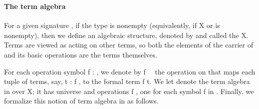 \begin{code}
\AgdaSymbol{)}\AgdaSpace{}%
\AgdaSymbol{=}\AgdaSpace{}%
\AgdaSpace{}%
\AgdaSymbol{(}\AgdaSpace{}%
\AgdaSpace{}%
\AgdaSymbol{)}\<%
\\
%
\>[1]\AgdaSpace{}%
\AgdaSymbol{(}\AgdaSpace{}%
\AgdaSymbol{)}\AgdaSpace{}%
\AgdaSymbol{(}\AgdaSpace{}%
\AgdaSymbol{)}\AgdaSpace{}%
\AgdaSymbol{=}\AgdaSpace{}%
\AgdaSpace{}%
\AgdaSpace{}%
\AgdaSpace{}%
\AgdaSpace{}%
\AgdaSpace{}%
\AgdaSymbol{(}\AgdaSpace{}%
\AgdaSymbol{)}\AgdaSpace{}%
\AgdaSymbol{(}\AgdaSpace{}%
\AgdaSymbol{))}\<%
\\
%
\\[\AgdaEmptyExtraSkip]%
%
\>[1]%
\>[12]\AgdaSymbol{:}\AgdaSpace{}%
%
\>[29]\<%
\\
%
\>[1]\AgdaSpace{}%
\AgdaSymbol{=}\AgdaSpace{}%
\AgdaSpace{}%
\AgdaSymbol{\{}\AgdaSpace{}%
\AgdaSpace{}%
\AgdaSymbol{=}\AgdaSpace{}%
\AgdaSpace{}%
\AgdaSymbol{;}\AgdaSpace{}%
\AgdaSpace{}%
\AgdaSymbol{=}\AgdaSpace{}%
\AgdaSpace{}%
\AgdaSymbol{;}\AgdaSpace{}%
\AgdaSpace{}%
\AgdaSymbol{=}\AgdaSpace{}%
\AgdaSpace{}%
\AgdaSymbol{\}}\<%
\end{code}
\fi

\paragraph*{The term algebra}
For a given signature ,
\ifshort\else
if the type  is nonempty (equivalently, if \ab X or
 is nonempty), then
\fi
we define an algebraic structure, denoted by 
and called the    \ab X.  Terms are
viewed as acting on other terms, so both the elements of the carrier of  and its
basic operations are the terms themselves.

For each operation symbol \ab f : , we denote by \ab f~~ the
operation on  that maps each tuple of terms, say,
\ab t :  \ab f  , to the formal term \ab f \ab t.
We let  denote the term algebra in  over \ab X; it has universe  and
operations \ab f  , one for each symbol \ab f in .
Finally, we formalize this notion of term algebra in \agda as follows.

